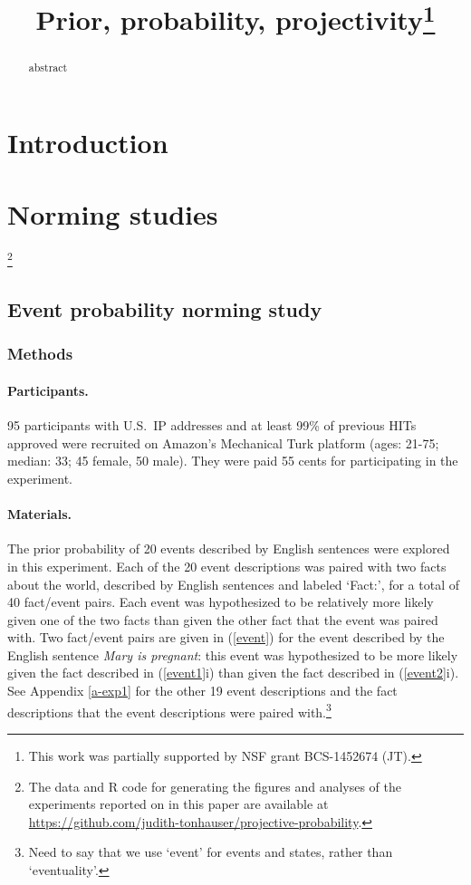 \documentclass[11pt,fleqn]{article}
\title{Prior, probability, projectivity\thanks{This work was partially supported by NSF grant BCS-1452674 (JT).}}
\newcommand{\6}{\mbox{$[\hspace*{-.6mm}[$}}
\newcommand{\9}{\mbox{$]\hspace*{-.6mm}]$}}
\begin{document}
\maketitle

\begin{abstract}
abstract
\end{abstract}
			
\section{Introduction}\label{s1}

\citealt*{tbd-variability}

\section{Norming studies}\label{s-pretests}

\footnote{\label{f-github}The
data and R code for generating the figures and analyses
of the experiments reported on in this paper are available at \url{https://github.com/judith-tonhauser/projective-probability}.}

\subsection{Event probability norming study}\label{s-pretest1}

\subsubsection{Methods}\label{s-methods-1}

\paragraph{Participants.} 95 participants with U.S.\ IP addresses and at least 99\% of previous HITs approved were recruited on Amazon's Mechanical Turk platform (ages: 21-75; median: 33; 45 female, 50 male). They were paid 55 cents for participating in the experiment. 

\paragraph{Materials.} The prior probability of 20 events described by English sentences were explored in this experiment. Each of the 20 event descriptions was paired with two facts about the world, described by English sentences and labeled `Fact:', for a total of 40 fact/event pairs. Each event was hypothesized to be relatively more likely given one of the two facts than given the other fact that the event was paired with. Two fact/event pairs are given in (\ref{event}) for the event described by the English sentence {\em Mary is pregnant}: this event was hypothesized to be more likely given the fact described in (\ref{event1}i) than given the fact described in (\ref{event2}i). See Appendix \ref{a-exp1} for the other 19 event descriptions and the fact descriptions that the event descriptions were paired with.\footnote{Need to say that we use `event' for events and states, rather than `eventuality'.}
\end{document}
